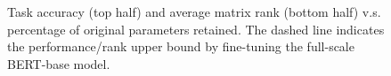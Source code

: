 \documentclass[11pt]{article}
\begin{document}

\begin{figure}[t]
	\centering
	\caption{Task accuracy (top half) and average matrix rank (bottom half) v.s. percentage of original parameters retained. The dashed line indicates the performance/rank upper bound by fine-tuning the full-scale BERT-base model.}
	\label{fig:pre}
\end{figure}
\end{document}
